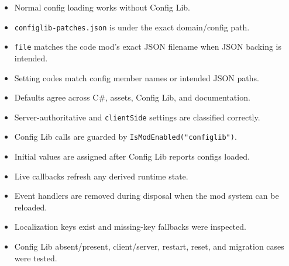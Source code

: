 \documentclass[
  11pt,
  letterpaper,
  titlepage]{article}
\providecommand{\tightlist}{%
  \setlength{\itemsep}{0pt}\setlength{\parskip}{0pt}}
\begin{document}
\begin{itemize}
\tightlist
\item[$\square$]
  Normal config loading works without Config Lib.
\item[$\square$]
  \texttt{configlib-patches.json} is under the exact domain/config path.
\item[$\square$]
  \texttt{file} matches the code mod's exact JSON filename when JSON
  backing is intended.
\item[$\square$]
  Setting codes match config member names or intended JSON paths.
\item[$\square$]
  Defaults agree across C\#, assets, Config Lib, and documentation.
\item[$\square$]
  Server-authoritative and \texttt{clientSide} settings are classified
  correctly.
\item[$\square$]
  Config Lib calls are guarded by \texttt{IsModEnabled("configlib")}.
\item[$\square$]
  Initial values are assigned after Config Lib reports configs loaded.
\item[$\square$]
  Live callbacks refresh any derived runtime state.
\item[$\square$]
  Event handlers are removed during disposal when the mod system can be
  reloaded.
\item[$\square$]
  Localization keys exist and missing-key fallbacks were inspected.
\item[$\square$]
  Config Lib absent/present, client/server, restart, reset, and
  migration cases were tested.
\end{itemize}
\end{document}
